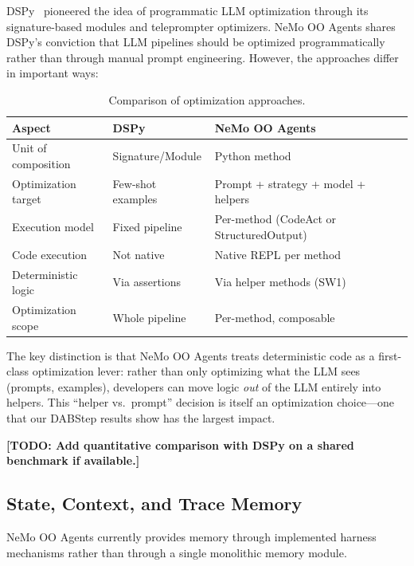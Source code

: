 \documentclass[11pt, logo, onecolumn, copyright, colorlinks=true, allcolors=blue]{nvidiatechreport}
\newcommand{\placeholder}[1]{\textcolor{red!60!black}{\textbf{[TODO: #1]}}}
\begin{document}
DSPy~\cite{khattab2023dspy} pioneered the idea of programmatic LLM optimization
through its signature-based modules and teleprompter optimizers. NeMo OO Agents shares
DSPy's conviction that LLM pipelines should be optimized programmatically rather
than through manual prompt engineering. However, the approaches differ in
important ways:

\begin{table}[h]
\centering
\caption{Comparison of optimization approaches.}
\label{tab:dspy-comparison}
\begin{tabular}{lll}
\toprule
\textbf{Aspect} & \textbf{DSPy} & \textbf{NeMo OO Agents} \\
\midrule
Unit of composition & Signature/Module & Python method \\
Optimization target & Few-shot examples & Prompt + strategy + model + helpers \\
Execution model & Fixed pipeline & Per-method (CodeAct or StructuredOutput) \\
Code execution & Not native & Native REPL per method \\
Deterministic logic & Via assertions & Via helper methods (SW1) \\
Optimization scope & Whole pipeline & Per-method, composable \\
\bottomrule
\end{tabular}
\end{table}

The key distinction is that NeMo OO Agents treats deterministic code as a first-class
optimization lever: rather than only optimizing what the LLM sees (prompts,
examples), developers can move logic \emph{out} of the LLM entirely into helpers.
This ``helper vs.\ prompt'' decision is itself an optimization choice---one that
our DABStep results show has the largest impact.

\placeholder{Add quantitative comparison with DSPy on a shared benchmark if
available.}



\subsection{State, Context, and Trace Memory}
\label{sec:memory}

NeMo OO Agents currently provides memory through implemented harness mechanisms
rather than through a single monolithic memory module.
\end{document}
